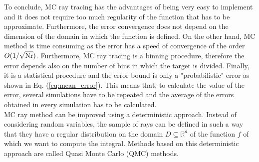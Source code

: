 To conclude, MC ray tracing has the advantages of being very easy to implement and it does not require too much regularity of the function that has to be approximate. Furthermore, the error convergence does not depend on the dimension of the domain in which the function is defined.
On the other hand, MC method is time consuming as the error has a speed of convergence of the order $O(1/\sqrt{\textrm{Nr}})$. Furthermore, MC ray tracing is a binning procedure, therefore the error depends also on the number of bins in which the target is divided. Finally, it is a statistical procedure and the error bound is only a "probabilistic" error as shown in Eq. (\ref{eq:mean_error}). This means that, to calculate the value of the error, several simulations have to be repeated and the average of the errors obtained in every simulation has to be calculated. \\ \indent MC ray method can be improved using a deterministic approach.
Instead of considering random variables, the sample of rays can be defined in such a way that they have a regular distribution on the domain $D\subseteq\mathbb{R}^d$ of the function $f$ of which we want to compute the integral. Methods based on this deterministic approach are called Quasi Monte Carlo (QMC) methods.
